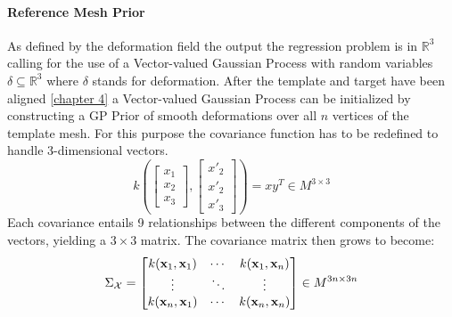 \paragraph{Reference Mesh Prior}
As defined by the deformation field the output the regression problem is in $\mathbb{R}^3$ calling for the use of a Vector-valued Gaussian Process with random variables $\delta \subseteq \mathbb{R}^3$ where $\delta$ stands for deformation. 
After the template and target have been aligned \ref{chapter 4} a Vector-valued Gaussian Process can be initialized by constructing a GP Prior of smooth deformations over all $n$ vertices of the template mesh. For this purpose the covariance function has to be redefined to handle 3-dimensional vectors.
\begin{equation}
    k\left(
    \begin{bmatrix}x_{1}\\x_{2}\\x_{3}\end{bmatrix},
    \begin{bmatrix}x'_{2}\\x'_{2}\\x'_{3}\end{bmatrix}
    \right) = x y^T \in M^{3 \times 3}
\end{equation}
Each covariance entails 9 relationships between the different components of the vectors, yielding a $3 \times 3$ matrix. The covariance matrix then grows to become: 
\begin{equation}
    \Sigma_{\mathcal{X}} = 
\begin{bmatrix}
    k(\textbf{x}_{1},\textbf{x}_{1}) & \cdots & k(\textbf{x}_{1},\textbf{x}_{n}) \\
\vdots & \ddots & \vdots \\
k(\textbf{x}_{n},\textbf{x}_{1}) & \cdots & k(\textbf{x}_{n},\textbf{x}_{n})
\end{bmatrix} \in M^{3n \times 3n}
\end{equation}

